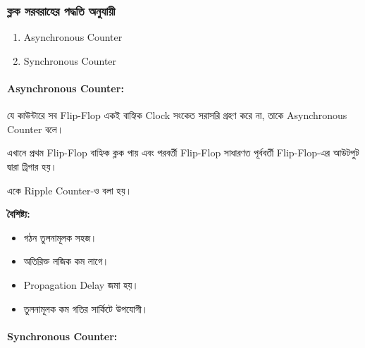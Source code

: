 \subsubsection*{ক্লক সরবরাহের পদ্ধতি অনুযায়ী}

\begin{enumerate}[leftmargin=*,itemsep=3pt]

    \item \textenglish{Asynchronous Counter}
    \item \textenglish{Synchronous Counter}

\end{enumerate}



\paragraph{\textenglish{Asynchronous Counter}:}

যে কাউন্টারে সব \textenglish{Flip-Flop} একই বাহ্যিক
\textenglish{Clock} সংকেত সরাসরি গ্রহণ করে না,
তাকে \textenglish{Asynchronous Counter} বলে।

এখানে প্রথম \textenglish{Flip-Flop} বাহ্যিক ক্লক পায় এবং
পরবর্তী \textenglish{Flip-Flop} সাধারণত পূর্ববর্তী
\textenglish{Flip-Flop}-এর আউটপুট দ্বারা ট্রিগার হয়।

একে \textenglish{Ripple Counter}-ও বলা হয়।

\textbf{বৈশিষ্ট্য:}

\begin{itemize}[label={{\bulletfont\textbullet}}, leftmargin=*, nosep]
    \item গঠন তুলনামূলক সহজ।
    \item অতিরিক্ত লজিক কম লাগে।
    \item \textenglish{Propagation Delay} জমা হয়।
    \item তুলনামূলক কম গতির সার্কিটে উপযোগী।
\end{itemize}



\paragraph{\textenglish{Synchronous Counter}:}

